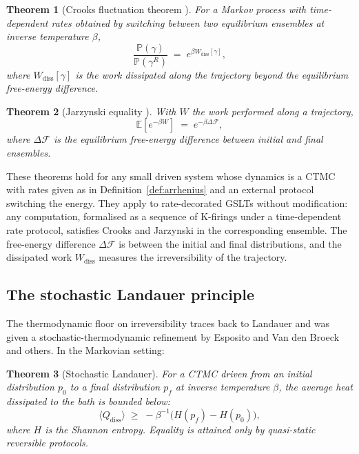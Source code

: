 \documentclass[11pt]{article}
\theoremstyle{plain}
\newtheorem{theorem}{Theorem}[section]
\theoremstyle{definition}
\theoremstyle{remark}
\newcommand{\E}{\mathbb{E}}
\newcommand{\Prob}{\mathbb{P}}
\newcommand{\F}{\mathcal{F}}
\begin{document}
\begin{theorem}[Crooks fluctuation theorem \cite{Crooks99}]\label{thm:crooks}
For a Markov process with time-dependent rates obtained by switching between two equilibrium ensembles at inverse temperature $\beta$,
\[
\frac{\Prob(\gamma)}{\Prob(\gamma^R)} \;=\; e^{\beta W_{\mathrm{diss}}[\gamma]},
\]
where $W_{\mathrm{diss}}[\gamma]$ is the work dissipated along the trajectory beyond the equilibrium free-energy difference.
\end{theorem}

\begin{theorem}[Jarzynski equality \cite{Jarzynski97}]\label{thm:jarzynski}
With $W$ the work performed along a trajectory,
\[
\E[e^{-\beta W}] \;=\; e^{-\beta \Delta \F},
\]
where $\Delta \F$ is the equilibrium free-energy difference between initial and final ensembles.
\end{theorem}

These theorems hold for any small driven system whose dynamics is a CTMC with rates given as in Definition~\ref{def:arrhenius} and an external protocol switching the energy. They apply to rate-decorated GSLTs without modification: any computation, formalised as a sequence of K-firings under a time-dependent rate protocol, satisfies Crooks and Jarzynski in the corresponding ensemble. The free-energy difference $\Delta \F$ is between the initial and final distributions, and the dissipated work $W_{\mathrm{diss}}$ measures the irreversibility of the trajectory.

\subsection{The stochastic Landauer principle}

The thermodynamic floor on irreversibility traces back to Landauer \cite{Landauer61} and was given a stochastic-thermodynamic refinement by Esposito and Van den Broeck \cite{EspVdB10} and others. In the Markovian setting:

\begin{theorem}[Stochastic Landauer]\label{thm:landauer}
For a CTMC driven from an initial distribution $p_0$ to a final distribution $p_f$ at inverse temperature $\beta$, the average heat dissipated to the bath is bounded below:
\[
\langle Q_{\mathrm{diss}} \rangle \;\geq\; -\beta^{-1} \bigl( H(p_f) - H(p_0) \bigr),
\]
where $H$ is the Shannon entropy. Equality is attained only by quasi-static reversible protocols.
\end{theorem}
\end{document}
